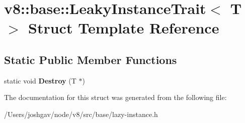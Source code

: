\hypertarget{structv8_1_1base_1_1_leaky_instance_trait}{}\section{v8\+:\+:base\+:\+:Leaky\+Instance\+Trait$<$ T $>$ Struct Template Reference}
\label{structv8_1_1base_1_1_leaky_instance_trait}
\subsection*{Static Public Member Functions}
\begin{DoxyCompactItemize}
\item 
static void {\bfseries Destroy} (T $\ast$)\hypertarget{structv8_1_1base_1_1_leaky_instance_trait_acf87b18eb53d3c141242ce3d914af876}{}\label{structv8_1_1base_1_1_leaky_instance_trait_acf87b18eb53d3c141242ce3d914af876}

\end{DoxyCompactItemize}


The documentation for this struct was generated from the following file\+:\begin{DoxyCompactItemize}
\item 
/\+Users/joshgav/node/v8/src/base/lazy-\/instance.\+h\end{DoxyCompactItemize}

